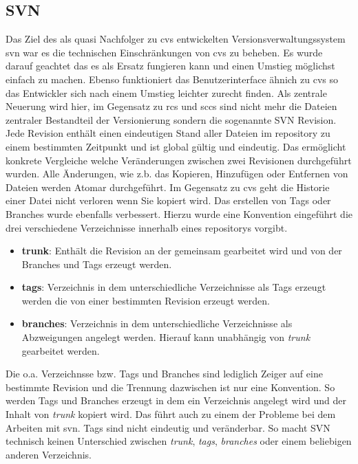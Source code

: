 \subsection{SVN}\label{sec:svn}
Das Ziel des als quasi Nachfolger zu \acrshort{cvs} entwickelten
Versionsverwaltungssystem \acrfull{svn} war es die technischen Einschränkungen
von \acrshort{cvs} zu beheben. Es wurde darauf geachtet das es als Ersatz
fungieren kann und einen Umstieg möglichst einfach zu machen. Ebenso
funktioniert das Benutzerinterface ähnich zu \acrshort{cvs} so das Entwickler
sich nach einem Umstieg leichter zurecht finden. Als zentrale Neuerung wird
hier, im Gegensatz zu \acrshort{rcs} und \acrshort{sccs} sind nicht mehr die
Dateien zentraler Bestandteil der Versionierung sondern die sogenannte SVN
Revision. Jede Revision enthält einen eindeutigen Stand aller Dateien im
\gls{repository} zu einem bestimmten Zeitpunkt und ist global gültig und
eindeutig. Das ermöglicht konkrete Vergleiche welche Veränderungen zwischen
zwei Revisionen durchgeführt wurden. Alle Änderungen, wie z.b. das Kopieren,
Hinzufügen oder Entfernen von Dateien werden Atomar durchgeführt. Im Gegensatz
zu \acrshort{cvs} geht die Historie einer Datei nicht verloren wenn Sie kopiert
wird. Das erstellen von Tags oder Branches wurde ebenfalls verbessert. Hierzu wurde eine Konvention eingeführt die drei verschiedene Verzeichnisse innerhalb eines \glspl{repository} vorgibt.
\begin{itemize}
\item \textbf{trunk}: Enthält die Revision an der gemeinsam gearbeitet wird
       und von der Branches und Tags erzeugt werden.
\item \textbf{tags}: Verzeichnis in dem unterschiedliche Verzeichnisse als
       Tags erzeugt werden die von einer bestimmten Revision erzeugt werden.
\item \textbf{branches}: Verzeichnis in dem unterschiedliche Verzeichnisse als
      Abzweigungen angelegt werden. Hierauf kann unabhängig von \textit{trunk}
      gearbeitet werden.
\end{itemize}
Die o.a. Verzeichnsse bzw. Tags und Branches sind lediglich Zeiger auf eine
bestimmte Revision und die Trennung dazwischen ist nur eine Konvention. So
werden Tags und Branches erzeugt in dem ein Verzeichnis angelegt wird und der
Inhalt von \textit{trunk} kopiert wird. Das führt auch zu einem der Probleme
bei dem Arbeiten mit \acrlong{svn}. Tags sind nicht eindeutig und veränderbar.
So macht SVN technisch keinen Unterschied zwischen \textit{trunk},
\textit{tags}, \textit{branches} oder einem beliebigen anderen Verzeichnis.
